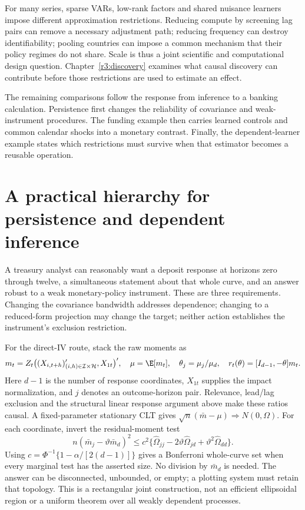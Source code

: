 For many series, sparse VARs, low-rank factors and shared nuisance
learners impose different approximation restrictions. Reducing compute
by screening lag pairs can remove a necessary adjustment path; reducing
frequency can destroy identifiability; pooling countries can impose a
common mechanism that their policy regimes do not share. Scale is thus
a joint scientific and computational design question. Chapter~\ref{r3:discovery} examines what causal discovery can contribute
before those restrictions are used to estimate an effect.

The remaining comparisons follow the response from inference to a banking
calculation. Persistence first changes the reliability of covariance and
weak-instrument procedures. The funding example then carries learned
controls and common calendar shocks into a monetary contrast. Finally,
the dependent-learner example states which restrictions must survive when
that estimator becomes a reusable operation.



\section{A practical hierarchy for persistence and dependent inference}
\label{s5:response-inference}
A treasury analyst can reasonably want a deposit response at horizons zero
through twelve, a simultaneous statement about that whole curve, and an
answer robust to a weak monetary-policy instrument. These are three
requirements. Changing the covariance bandwidth addresses dependence;
changing to a reduced-form projection may change the target; neither action
establishes the instrument's exclusion restriction.

For the direct-IV route, stack the raw moments as
\[
 m_t=Z_t\big((X_{i,t+h})_{(i,h)\in\mathcal I\times\mathcal H}',X_{1t}\big)',
 \quad \mu=\E[m_t],\quad \theta_j=\mu_j/\mu_d,
 \quad r_t(\theta)=[I_{d-1},-\theta]m_t.
\]
Here $d-1$ is the number of response coordinates, $X_{1t}$ supplies the
impact normalization, and $j$ denotes an outcome-horizon pair. Relevance,
lead/lag exclusion and the structural linear response argument above make
these ratios causal. A fixed-parameter stationary CLT gives
$\sqrt n(\bar m-\mu)\Rightarrow N(0,\Omega)$.
For each coordinate, invert the residual-moment test
\begin{equation}
 n(\bar m_j-\vartheta\bar m_d)^2\le
 c^2\{\hat\Omega_{jj}-2\vartheta\hat\Omega_{jd}
                +\vartheta^2\hat\Omega_{dd}\}.
 \label{s5:residual-set}
\end{equation}
Using $c=\Phi^{-1}\{1-\alpha/[2(d-1)]\}$ gives a Bonferroni whole-curve
set when every marginal test has the asserted size. No division by
$\bar m_d$ is needed. The answer can be disconnected, unbounded, or empty;
a plotting system must retain that topology. This is a rectangular joint
construction, not an efficient ellipsoidal region or a uniform theorem over
all weakly dependent processes.

